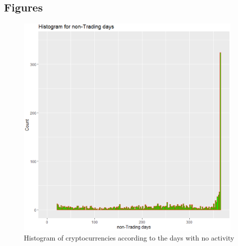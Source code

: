 \documentclass{bmcart}
\begin{document}
\begin{backmatter}



\section*{Figures}

\begin{figure}[h!]
	\centering
	\includegraphics[width=110mm]{NonTradingDaysHist.eps} 
	\caption{Histogram of cryptocurrencies according to the days with no activity}
	\label{fig:TradingDays}
\end{figure}


\end{backmatter}
\end{document}
